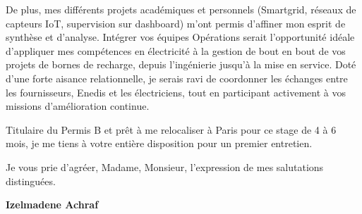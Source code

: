 \documentclass[10pt,a4paper]{../../altacv}
\begin{document}
\vspace{0.4cm}

De plus, mes différents projets académiques et personnels (Smartgrid, réseaux de capteurs IoT, supervision sur dashboard) m'ont permis d'affiner mon esprit de synthèse et d'analyse. Intégrer vos équipes Opérations serait l'opportunité idéale d'appliquer mes compétences en électricité à la gestion de bout en bout de vos projets de bornes de recharge, depuis l'ingénierie jusqu'à la mise en service. Doté d'une forte aisance relationnelle, je serais ravi de coordonner les échanges entre les fournisseurs, Enedis et les électriciens, tout en participant activement à vos missions d'amélioration continue. 

\vspace{0.4cm}

Titulaire du Permis B et prêt à me relocaliser à Paris pour ce stage de 4 à 6 mois, je me tiens à votre entière disposition pour un premier entretien. 

\vspace{0.5cm}

Je vous prie d'agréer, Madame, Monsieur, l'expression de mes salutations distinguées.

\vfill

\begin{flushright}
  \Large\color{emphasis}\textbf{Izelmadene Achraf}
\end{flushright}
\end{document}
